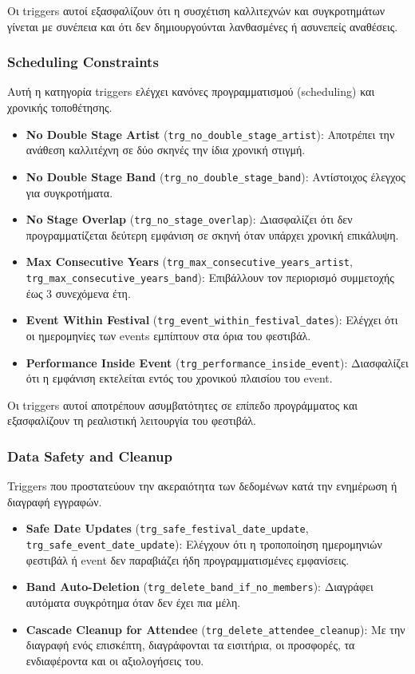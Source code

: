 \documentclass[13pt]{extarticle}
\begin{document}
Οι triggers αυτοί εξασφαλίζουν ότι η συσχέτιση καλλιτεχνών και συγκροτημάτων γίνεται με συνέπεια και ότι δεν δημιουργούνται λανθασμένες ή ασυνεπείς αναθέσεις.

\subsubsection{Scheduling Constraints}

Αυτή η κατηγορία triggers ελέγχει κανόνες προγραμματισμού (scheduling) και χρονικής τοποθέτησης.

\begin{itemize}
    \item \textbf{No Double Stage Artist} (\texttt{trg\_no\_double\_stage\_artist}): Αποτρέπει την ανάθεση καλλιτέχνη σε δύο σκηνές την ίδια χρονική στιγμή.
    \item \textbf{No Double Stage Band} (\texttt{trg\_no\_double\_stage\_band}): Αντίστοιχος έλεγχος για συγκροτήματα.
    \item \textbf{No Stage Overlap} (\texttt{trg\_no\_stage\_overlap}): Διασφαλίζει ότι δεν προγραμματίζεται δεύτερη εμφάνιση σε σκηνή όταν υπάρχει χρονική επικάλυψη.
    \item \textbf{Max Consecutive Years} (\texttt{trg\_max\_consecutive\_years\_artist}, \texttt{trg\_max\_consecutive\_years\_band}): Επιβάλλουν τον περιορισμό συμμετοχής έως 3 συνεχόμενα έτη.
    \item \textbf{Event Within Festival} (\texttt{trg\_event\_within\_festival\_dates}): Ελέγχει ότι οι ημερομηνίες των events εμπίπτουν στα όρια του φεστιβάλ.
    \item \textbf{Performance Inside Event} (\texttt{trg\_performance\_inside\_event}): Διασφαλίζει ότι η εμφάνιση εκτελείται εντός του χρονικού πλαισίου του event.
\end{itemize}

Οι triggers αυτοί αποτρέπουν ασυμβατότητες σε επίπεδο προγράμματος και εξασφαλίζουν τη ρεαλιστική λειτουργία του φεστιβάλ.

\subsubsection{Data Safety and Cleanup}

Triggers που προστατεύουν την ακεραιότητα των δεδομένων κατά την ενημέρωση ή διαγραφή εγγραφών.

\begin{itemize}
    \item \textbf{Safe Date Updates} (\texttt{trg\_safe\_festival\_date\_update}, \texttt{trg\_safe\_event\_date\_update}): Ελέγχουν ότι η τροποποίηση ημερομηνιών φεστιβάλ ή event δεν παραβιάζει ήδη προγραμματισμένες εμφανίσεις.
    \item \textbf{Band Auto-Deletion} (\texttt{trg\_delete\_band\_if\_no\_members}): Διαγράφει αυτόματα συγκρότημα όταν δεν έχει πια μέλη.
    \item \textbf{Cascade Cleanup for Attendee} (\texttt{trg\_delete\_attendee\_cleanup}): Με την διαγραφή ενός επισκέπτη, διαγράφονται τα εισιτήρια, οι προσφορές, τα ενδιαφέροντα και οι αξιολογήσεις του.
\end{itemize}
\end{document}
